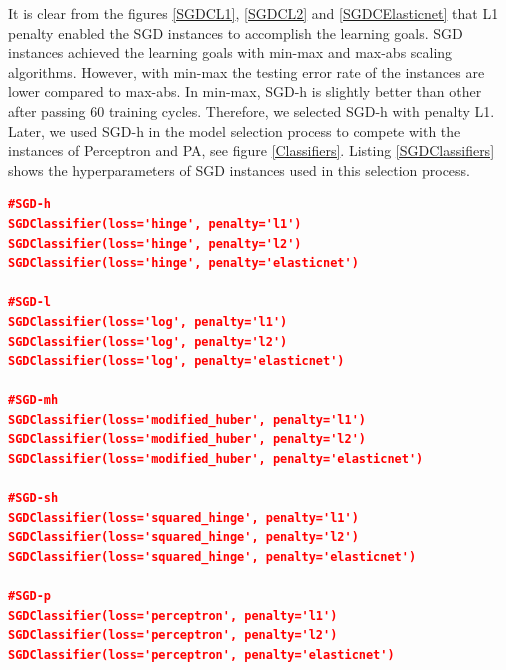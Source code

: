 \documentclass[a4paper,12pt]{article}
\begin{document}
It is clear from the figures \ref{SGDCL1}, \ref{SGDCL2} and \ref{SGDCElasticnet} that L1 penalty enabled the SGD instances to accomplish the learning goals. SGD instances achieved the learning goals with min-max and max-abs scaling algorithms. However, with min-max the testing error rate of the instances are lower compared to max-abs. In min-max, SGD-h is slightly better than other after passing 60 training cycles. Therefore, we selected SGD-h with penalty L1. Later, we used SGD-h in the model selection process to compete with the instances of Perceptron and PA, see figure \ref{Classifiers}. Listing \ref{SGDClassifiers} shows the hyperparameters of SGD instances used in this selection process.
\begin{lstlisting}[language=json, caption=Hyperparameters of SGD instances for classification approach, label=SGDClassifiers]
#SGD-h
SGDClassifier(loss='hinge', penalty='l1')
SGDClassifier(loss='hinge', penalty='l2')
SGDClassifier(loss='hinge', penalty='elasticnet')

#SGD-l
SGDClassifier(loss='log', penalty='l1')
SGDClassifier(loss='log', penalty='l2')
SGDClassifier(loss='log', penalty='elasticnet')

#SGD-mh
SGDClassifier(loss='modified_huber', penalty='l1')
SGDClassifier(loss='modified_huber', penalty='l2')
SGDClassifier(loss='modified_huber', penalty='elasticnet')

#SGD-sh
SGDClassifier(loss='squared_hinge', penalty='l1')
SGDClassifier(loss='squared_hinge', penalty='l2')
SGDClassifier(loss='squared_hinge', penalty='elasticnet')

#SGD-p
SGDClassifier(loss='perceptron', penalty='l1')
SGDClassifier(loss='perceptron', penalty='l2')
SGDClassifier(loss='perceptron', penalty='elasticnet')
\end{lstlisting}
\end{document}
